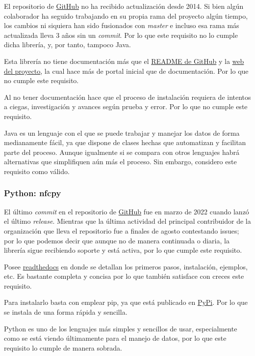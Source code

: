 \begin{todolist}
    \item El repositorio de \href{https://github.com/grundid/nfctools}{GitHub}
    no ha recibido actualización desde 2014. Si bien algún colaborador ha
    seguido trabajando en su propia rama del proyecto algún tiempo, los cambios
    ni siquiera han sido fusionados con \emph{master} e incluso esa rama más
    actualizada lleva 3 años sin un \emph{commit}. Por lo que este requisito no lo
    cumple dicha librería, y, por tanto, tampoco Java.
    \item Esta librería no tiene documentación más que el
    \href{https://github.com/grundid/nfctools/blob/master/README}{README de
    GitHub} y la \href{https://www.grundid.de/nfc/index.html}{web del proyecto},
    la cual hace más de portal inicial que de documentación. Por lo que no
    cumple este requisito.
    \item Al no tener documentación hace que el proceso de instalación requiera
    de intentos a ciegas, investigación y avances según prueba y error. Por lo
    que no cumple este requisito.
    \item[\xcmark] Java es un lenguaje con el que se puede trabajar y manejar
    los datos de forma medianamente fácil, ya que dispone de clases hechas que
    automatizan y facilitan parte del proceso. Aunque igualmente si se compara
    con otros lenguajes habrá alternativas que simplifiquen aún más el proceso.
    Sin embargo, considero este requisito como válido.
\end{todolist}

\subsubsection{Python: nfcpy}

\begin{todolist}
    \item [\xcmark] El último \emph{commit} en el repositorio de
    \href{https://github.com/nfcpy/nfcpy}{GitHub} fue en marzo de 2022 cuando
    lanzó el último \emph{release}. Mientras que la última actividad del principal
    contribuidor de la organización que lleva el repositorio fue a finales de
    agosto contestando issues; por lo que podemos decir que aunque no de manera
    continuada o diaria, la librería sigue recibiendo soporte y está activa, por
    lo que cumple este requisito.
    \item [\xcmark] Posee
    \href{https://nfcpy.readthedocs.io/en/latest/index.html}{readthedocs} en
    donde se detallan los primeros pasos, instalación, ejemplos, etc. Es
    bastante completa y concisa por lo que también satisface con creces este
    requisito.
    \item [\xcmark] Para instalarlo basta con emplear pip, ya que está publicado en
    \href{https://pypi.org/project/nfcpy/}{PyPi}. Por lo que se instala de una
    forma rápida y sencilla.
    \item[\xcmark] Python es uno de los lenguajes más simples y sencillos de
    usar, especialmente como se está viendo últimamente para el manejo de datos,
    por lo que este requisito lo cumple de manera sobrada.
\end{todolist}

